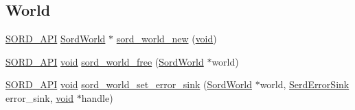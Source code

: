 \subsection*{World}
\begin{DoxyCompactItemize}
\item 
\hyperlink{sord_8h_a1a2e27663366eb6ff41e062a0a880f48}{S\+O\+R\+D\+\_\+\+A\+PI} \hyperlink{group__sord_ga133d918ec58f829198b2cf65f250ed69}{Sord\+World} $\ast$ \hyperlink{group__sord_gaed6f1a14a2d2750435bff14fc644e8cc}{sord\+\_\+world\+\_\+new} (\hyperlink{sound_8c_ae35f5844602719cf66324f4de2a658b3}{void})
\item 
\hyperlink{sord_8h_a1a2e27663366eb6ff41e062a0a880f48}{S\+O\+R\+D\+\_\+\+A\+PI} \hyperlink{sound_8c_ae35f5844602719cf66324f4de2a658b3}{void} \hyperlink{group__sord_gacc90d35094a70d4acfb2ba1ce00cfbcc}{sord\+\_\+world\+\_\+free} (\hyperlink{group__sord_ga133d918ec58f829198b2cf65f250ed69}{Sord\+World} $\ast$world)
\item 
\hyperlink{sord_8h_a1a2e27663366eb6ff41e062a0a880f48}{S\+O\+R\+D\+\_\+\+A\+PI} \hyperlink{sound_8c_ae35f5844602719cf66324f4de2a658b3}{void} \hyperlink{group__sord_gaf3939f3c6c19044e41f66622fd079762}{sord\+\_\+world\+\_\+set\+\_\+error\+\_\+sink} (\hyperlink{group__sord_ga133d918ec58f829198b2cf65f250ed69}{Sord\+World} $\ast$world, \hyperlink{group__serd_ga925d2fda236697a3e643b307ffe242e5}{Serd\+Error\+Sink} error\+\_\+sink, \hyperlink{sound_8c_ae35f5844602719cf66324f4de2a658b3}{void} $\ast$handle)
\end{DoxyCompactItemize}
